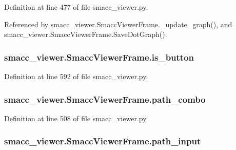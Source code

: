 Definition at line 477 of file smacc\+\_\+viewer.\+py.



Referenced by smacc\+\_\+viewer.\+Smacc\+Viewer\+Frame.\+\_\+update\+\_\+graph(), and smacc\+\_\+viewer.\+Smacc\+Viewer\+Frame.\+Save\+Dot\+Graph().

\subsubsection[{\texorpdfstring{is\+\_\+button}{is_button}}]{\setlength{\rightskip}{0pt plus 5cm}smacc\+\_\+viewer.\+Smacc\+Viewer\+Frame.\+is\+\_\+button}\hypertarget{classsmacc__viewer_1_1SmaccViewerFrame_a9d2088f270fd6dfd646aa23af2fefc69}{}\label{classsmacc__viewer_1_1SmaccViewerFrame_a9d2088f270fd6dfd646aa23af2fefc69}


Definition at line 592 of file smacc\+\_\+viewer.\+py.

\subsubsection[{\texorpdfstring{path\+\_\+combo}{path_combo}}]{\setlength{\rightskip}{0pt plus 5cm}smacc\+\_\+viewer.\+Smacc\+Viewer\+Frame.\+path\+\_\+combo}\hypertarget{classsmacc__viewer_1_1SmaccViewerFrame_a2b2ee042e4a0d11372e1d12c1925a286}{}\label{classsmacc__viewer_1_1SmaccViewerFrame_a2b2ee042e4a0d11372e1d12c1925a286}


Definition at line 508 of file smacc\+\_\+viewer.\+py.

\subsubsection[{\texorpdfstring{path\+\_\+input}{path_input}}]{\setlength{\rightskip}{0pt plus 5cm}smacc\+\_\+viewer.\+Smacc\+Viewer\+Frame.\+path\+\_\+input}\hypertarget{classsmacc__viewer_1_1SmaccViewerFrame_ab4ef6a1eb110cd0497c3e37bf66b79d7}{}\label{classsmacc__viewer_1_1SmaccViewerFrame_ab4ef6a1eb110cd0497c3e37bf66b79d7}


